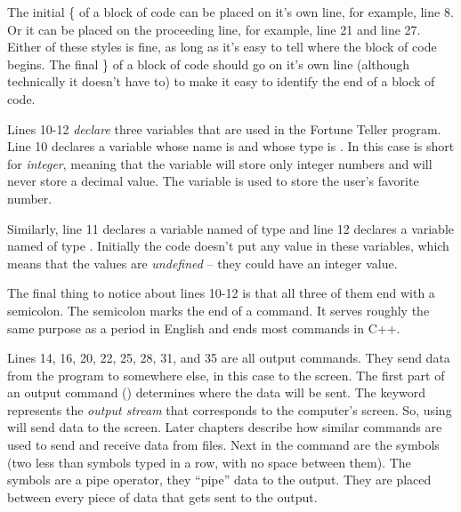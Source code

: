 The initial \{ of a block of code can be placed on it's own line, for example, line 8.  Or it can be placed on the proceeding line, for example, line 21 and line 27.  Either of these styles is fine, as long as it's easy to tell where the block of code begins.  The final \} of a block of code should go on it's own line (although technically it doesn't have to) to make it easy to identify the end of a block of code.


Lines 10-12 \emph{declare} three variables that are used in the Fortune Teller program.  Line 10 declares a variable whose name is  and whose type is . In this case  is short for \emph{integer}, meaning that the variable  will store only integer numbers and will never store a decimal value.  
The variable  is used to store the user's favorite number. 

Similarly, line 11 declares a variable named  of type  and line 12 declares a variable named   of type .  Initially the code doesn't put any value in these variables, which means that the values are \emph{undefined} -- they could have an integer value.

The final thing to notice about lines 10-12 is that all three of them end with a semicolon.  The semicolon marks the end of a command.  It serves roughly the same purpose as a period in English and ends most commands in C++.  


Lines 14, 16, 20, 22, 25, 28, 31, and 35 are all output commands.  They send data from the program to somewhere else, in this case to the screen.  The first part of an output command () determines where the data will be sent.  The keyword  represents the \emph{output stream} that corresponds to the computer's screen.  So, using  will send data to the screen.  Later chapters describe how similar commands are used to send and receive data from files.  Next in the command are the symbols \cf{$<<$} (two less than symbols typed in a row, with no space between them).  The symbols \cf{$<<$} are a pipe operator, they ``pipe'' data to the output.  They are placed between every piece of data that gets sent to the output.

